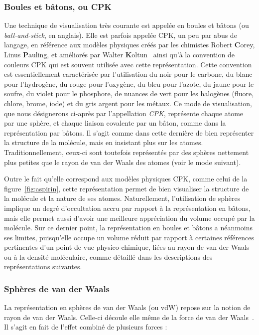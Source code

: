 \begin{appendices}
	\subsubsection{Boules et bâtons, ou CPK} Une technique de visualisation très courante est appelée \og en boules et bâtons \fg{} (ou \emph{ball-and-stick}, en anglais). Elle est parfois appelée CPK, un peu par abus de langage, en référence aux modèles physiques créés par les chimistes Robert \textbf{C}orey, Linus \textbf{P}auling, et améliorés par Walter \textbf{K}oltun~\cite{corey1953molecular, koltun1965space} ainsi qu'à la convention de couleurs CPK qui est souvent utilisée avec cette représentation. Cette convention est essentiellement caractérisée par l'utilisation du noir pour le carbone, du blanc pour l'hydrogène, du rouge pour l'oxygène, du bleu pour l'azote, du jaune pour le soufre, du violet pour le phosphore, de nuances de vert pour les halogènes (fluore, chlore, brome, iode) et du gris argent pour les métaux. Ce mode de visualisation, que nous désignerons ci-après par l'appellation \emph{CPK}, représente chaque atome par une sphère, et chaque liaison covalente par un bâton, comme dans la représentation par bâtons. Il s'agit comme dans cette dernière de bien représenter la structure de la molécule, mais en insistant plus sur les atomes. Traditionnellement, ceux-ci sont toutefois représentés par des sphères nettement plus petites que le rayon de van der Waals des atomes (voir le mode suivant).
		
	Outre le fait qu'elle correspond aux modèles physiques CPK, comme celui de la figure~\ref{fig:aspirin}, cette représentation permet de bien visualiser la structure de la molécule et la nature de ses atomes. Naturellement, l'utilisation de sphères implique un degré d'occultation accru par rapport à la représentation en bâtons, mais elle permet aussi d'avoir une meilleure appréciation du volume occupé par la molécule. Sur ce dernier point, la représentation en boules et bâtons a néanmoins ses limites, puisqu'elle occupe un volume réduit par rapport à certaines références pertinentes d'un point de vue physico-chimique, liées au rayon de van der Waals ou à la densité moléculaire, comme détaillé dans les descriptions des représentations suivantes.
		
	\subsubsection{Sphères de van der Waals} La représentation en sphères de van der Waals (ou vdW) repose sur la notion de rayon de van der Waals. Celle-ci découle elle même de la force de van der Waals~\cite{dzyaloshinskii1961general}. Il s'agit en fait de l'effet combiné de plusieurs forces :
	

\end{appendices}
